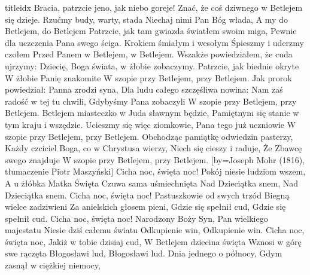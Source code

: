 \documentclass[a5paper, portrait, 12pt]{mwart}
\begin{document}
\begin{songs}{titleidx}
\beginverse
    Bracia, patrzcie jeno, jak niebo goreje!
    Znać, że coś dziwnego w Betlejem się dzieje.
    Rzućmy budy, warty, stada
    Niechaj nimi Pan Bóg włada,
    A my do Betlejem, do Betlejem 
\endverse
\beginverse
    Patrzcie, jak tam gwiazda światłem swoim miga,
    Pewnie dla uczczenia Pana swego ściga.
    Krokiem śmiałym i wesołym
    Śpieszmy i uderzmy czołem
    Przed Panem w Betlejem, w Betlejem.
\endverse
\beginverse
    Wszakże powiedziałem, że cuda ujrzymy:
    Dziecię, Boga świata, w żłobie zobaczymy.
    Patrzcie, jak biednie okryte
    W żłobie Panię znakomite
    W szopie przy Betlejem, przy Betlejem.
\endverse
\beginverse
    Jak prorok powiedział: Panna zrodzi syna,
    Dla ludu całego szczęśliwa nowina:
    Nam zaś radość w tej tu chwili,
    Gdybyśmy Pana zobaczyli
    W szopie przy Betlejem, przy Betlejem.
\endverse
\beginverse
    Betlejem miasteczko w Juda sławnym będzie,
    Pamiętnym się stanie w tym kraju i wszędzie.
    Ucieszmy się więc ziomkowie,
    Pana tego już uczniowie
    W szopie przy Betlejem, przy Betlejem.
\endverse
\beginverse
    Obchodząc pamiątkę odwiedzin pasterzy,
    Każdy czciciel Boga, co w Chrystusa wierzy,
    Niech się cieszy i raduje,
    Że Zbawcę swego znajduje
    W szopie przy Betlejem, przy Betlejem.
\endverse
\endsong
[by={Joseph Mohr (1816), tłumaczenie Piotr Maszyński}]
\beginverse
    Cicha noc, święta noc!
    Pokój niesie ludziom wszem,
    A u żłóbka Matka Święta
    Czuwa sama uśmiechnięta
    Nad Dzieciątka snem,
    Nad Dzieciątka snem.
\endverse
\beginverse
    Cicha noc, święta noc!
    Pastuszkowie od swych trzód
    Biegną wielce zadziwieni
    Za anielskich głosem pieni,
    Gdzie się spełnił cud,
    Gdzie się spełnił cud.
\endverse
\beginverse
    Cicha noc, święta noc!
    Narodzony Boży Syn,
    Pan wielkiego majestatu
    Niesie dziś całemu światu
    Odkupienie win,
    Odkupienie win.
\endverse
\beginverse
    Cicha noc, święta noc,
    Jakiż w tobie dzisiaj cud,
    W Betlejem dziecina święta
    Wznosi w górę swe rączęta
    Błogosławi lud,
    Błogosławi lud.
\endverse
\endsong
\beginverse
    Dnia jednego o północy,
    Gdym zasnął w ciężkiej niemocy,
\endverse
  \beginchorus

\end{songs}
\end{document}
